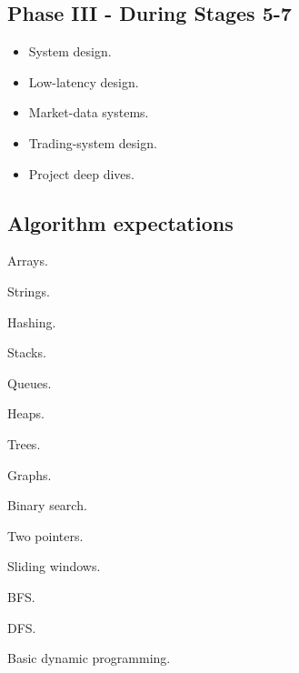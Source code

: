 \documentclass[11pt,letterpaper]{article}
\begin{document}
\subsection*{Phase III - During Stages 5-7}

\begin{itemize}

\item System design.

\item Low-latency design.

\item Market-data systems.

\item Trading-system design.

\item Project deep dives.

\end{itemize}

\subsection*{Algorithm expectations}

\begin{topics}

\item Arrays.

\item Strings.

\item Hashing.

\item Stacks.

\item Queues.

\item Heaps.

\item Trees.

\item Graphs.

\item Binary search.

\item Two pointers.

\item Sliding windows.

\item BFS.

\item DFS.

\item Basic dynamic programming.

\end{topics}
\end{document}
